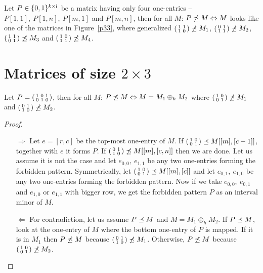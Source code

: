 \begin{thm}
Let $P\in\{0,1\}^{k\times l}$ be a matrix having only four one-entries -- $P[1,1],\ P[1,n],\ P[m,1]$ and $P[m,n]$, then for all $M$: $P\not\preceq M\Leftrightarrow M$ looks like one of the matrices in Figure~\ref{p33}, where generalized $\left(\begin{smallmatrix}1&1\\1&0\end{smallmatrix}\right)\not\preceq M_1$, $\left(\begin{smallmatrix}0&1\\1&1\end{smallmatrix}\right)\not\preceq M_2$, $\left(\begin{smallmatrix}1&1\\0&1\end{smallmatrix}\right)\not\preceq M_3$ and $\left(\begin{smallmatrix}1&0\\1&1\end{smallmatrix}\right)\not\preceq M_4$.
\end{thm}

\section{Matrices of size $2\times3$}
\begin{thm}
Let $P=\left(\begin{smallmatrix}1&0&1\\0&1&0\end{smallmatrix}\right)$, then for all $M$: $P\not\preceq M\Leftrightarrow M=M_1\oplus_hM_2$ where $\left(\begin{smallmatrix}1&0\\0&1\end{smallmatrix}\right)\not\preceq M_1$ and $\left(\begin{smallmatrix}0&1\\1&0\end{smallmatrix}\right)\not\preceq M_2$.
\end{thm}
\begin{proof}
\begin{itemize}
\item[$\Rightarrow$] Let $e=[r,c]$ be the top-most one-entry of $M$. If $\left(\begin{smallmatrix}1&0\\0&1\end{smallmatrix}\right)\preceq M[[m],[c-1]]$, together with $e$ it forms $P$. If $\left(\begin{smallmatrix}0&1\\1&0\end{smallmatrix}\right)\not\preceq M[[m],[c,n]]$ then we are done. Let us assume it is not the case and let $e_{0,0},\ e_{1,1}$ be any two one-entries forming the forbidden pattern. Symmetrically, let $\left(\begin{smallmatrix}1&0\\0&1\end{smallmatrix}\right)\preceq M[[m],[c]]$ and let $e_{0,1},\ e_{1,0}$ be any two one-entries forming the forbidden pattern. Now if we take $e_{0,0},\ e_{0,1}$ and $e_{1,0}$ or $e_{1,1}$ with bigger row, we get the forbidden pattern $P$ as an interval minor of $M$. 
\item[$\Leftarrow$] For contradiction, let us assume $P\preceq M$ and $M=M_1\oplus_hM_2$. If $P\preceq M$, look at the one-entry of $M$ where the bottom one-entry of $P$ is mapped. If it is in $M_1$ then $P\not\preceq M$ because $\left(\begin{smallmatrix}0&1\\1&0\end{smallmatrix}\right)\not\preceq M_1$. Otherwise, $P\not\preceq M$ because $\left(\begin{smallmatrix}1&0\\0&1\end{smallmatrix}\right)\not\preceq M_2$.
\end{itemize}
\end{proof}
